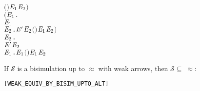 \begin{definition}
\begin{alltt}
                       \ensuremath{(} \HOLSymConst{\HOLTokenRCompose{}}  \HOLSymConst{\HOLTokenRCompose{}} \ensuremath{)} \ensuremath{\HOLBoundVar{E}\sb{\mathrm{1}}} \ensuremath{\HOLBoundVar{E}\sb{\mathrm{2}}}\ensuremath{)} \HOLSymConst{\HOLTokenConj{}}
          \ensuremath{(}\HOLSymConst{\HOLTokenForall{}}\ensuremath{\HOLBoundVar{E}\sb{\mathrm{1}}}.
                \HOLTokenWeakTransBegin\HOLSymConst{\ensuremath{\tau}}\HOLTokenWeakTransEnd \ensuremath{\HOLBoundVar{E}\sb{\mathrm{1}}} \HOLSymConst{\HOLTokenImp{}}
               \HOLSymConst{\HOLTokenExists{}}\ensuremath{\HOLBoundVar{E}\sb{\mathrm{2}}}. \ensuremath{\HOLBoundVar{E}\sp{\prime}} \HOLSymConst{\HOLTokenEPS} \ensuremath{\HOLBoundVar{E}\sb{\mathrm{2}}} \HOLSymConst{\HOLTokenConj{}} \ensuremath{(} \HOLSymConst{\HOLTokenRCompose{}}  \HOLSymConst{\HOLTokenRCompose{}} \ensuremath{)} \ensuremath{\HOLBoundVar{E}\sb{\mathrm{1}}} \ensuremath{\HOLBoundVar{E}\sb{\mathrm{2}}}\ensuremath{)} \HOLSymConst{\HOLTokenConj{}}
          \HOLSymConst{\HOLTokenForall{}}\ensuremath{\HOLBoundVar{E}\sb{\mathrm{2}}}.
              \ensuremath{\HOLBoundVar{E}\sp{\prime}} \HOLTokenWeakTransBegin\HOLSymConst{\ensuremath{\tau}}\HOLTokenWeakTransEnd \ensuremath{\HOLBoundVar{E}\sb{\mathrm{2}}} \HOLSymConst{\HOLTokenImp{}}
              \HOLSymConst{\HOLTokenExists{}}\ensuremath{\HOLBoundVar{E}\sb{\mathrm{1}}}.  \HOLSymConst{\HOLTokenEPS} \ensuremath{\HOLBoundVar{E}\sb{\mathrm{1}}} \HOLSymConst{\HOLTokenConj{}} \ensuremath{(} \HOLSymConst{\HOLTokenRCompose{}}  \HOLSymConst{\HOLTokenRCompose{}} \ensuremath{)} \ensuremath{\HOLBoundVar{E}\sb{\mathrm{1}}} \ensuremath{\HOLBoundVar{E}\sb{\mathrm{2}}}
\end{alltt}
\end{definition}

\begin{theorem}
If $\mathcal{S}$ is a bisimulation up to $\approx$ with weak arrows, then
$\mathcal{S} \subseteq\;\approx$:
\begin{alltt}
\HOLTokenTurnstile{}   \HOLSymConst{\HOLTokenConj{}}    \HOLSymConst{\HOLTokenImp{}}  \HOLSymConst{\HOLTokenWeakEQ} \hfill{[WEAK_EQUIV_BY_BISIM_UPTO_ALT]}
\end{alltt}
\end{theorem}

